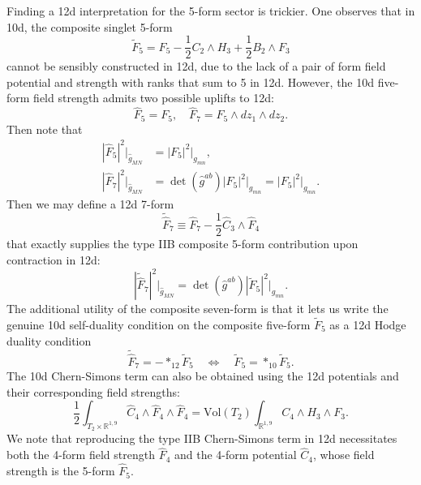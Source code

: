 Finding a 12d interpretation for the 5-form sector is trickier. 
One observes that in 10d, the composite \SLR{} singlet 5-form 
\begin{equation}
\tilde F_5 = F_5 - \frac12 C_2 \wedge H_3 + \frac{1}{2}B_2\wedge F_3    
\end{equation}
cannot be sensibly constructed in 12d, due to the lack of a pair of form field potential and strength with ranks that sum to 5 in 12d.
However, the 10d five-form field strength admits two possible uplifts to 12d:
\begin{equation}
\widehat{F}_5 = F_5,\quad \widehat{F}_7=F_5\wedge dz_1 \wedge dz_2.
\end{equation}
Then note that
\begin{equation}
\begin{aligned}
|\widehat{F}_5|^2\bigg|_{\widehat{g}_{MN}} 
&= |F_5|^2\bigg|_{g_{mn}},\\
|\widehat{F}_7|^2\bigg|_{\widehat{g}_{MN}}
&=\det(\widehat{g}^{ab})|F_5|^2\bigg|_{g_{mn}} = |F_5|^2\bigg|_{g_{mn}}.
\end{aligned}
\end{equation}
Then we may define a 12d 7-form
\begin{equation}
\widetilde{\widehat{F}}_7 \equiv \widehat{F}_7 - \frac{1}{2}\widehat{C}_3 \wedge \widehat{F}_4
\end{equation}
that exactly supplies the type IIB composite 5-form contribution upon contraction in 12d:
\begin{equation}
|\widetilde{\widehat{F}}_7|^2\bigg|_{\widehat{g}_{MN}} =
\det(\widehat{g}^{ab})|\tilde F_5|^2\bigg|_{g_{mn}}.
\end{equation}
The additional utility of the composite seven-form is that it lets us write the genuine 10d self-duality condition on the composite five-form $\tilde F_5$ as a 12d Hodge duality condition
\begin{equation}
\widetilde{\widehat{F}}_7 = -*_{12}\tilde F_5
\quad
\Leftrightarrow\quad
\tilde F_5 = *_{10}\tilde F_5.
\label{12d interpretation of 10d self-duality}
\end{equation}
The 10d Chern-Simons term can also be obtained using the 12d potentials and their corresponding field strengths:
\begin{equation}
\frac{1}{2}\int_{T_2\times \mathbb{R}^{1,9}} \widehat{C}_4\wedge \widehat{F}_4\wedge\widehat{F}_4=
\mathrm{Vol}(T_2)\int_{\mathbb{R}^{1,9}}C_4\wedge H_3\wedge F_3.
\end{equation}
We note that reproducing the type IIB Chern-Simons term in 12d necessitates both the 4-form field strength $\widehat F_4$ and the 4-form potential $\widehat C_4$, whose field strength is the 5-form $\widehat F_5$.

